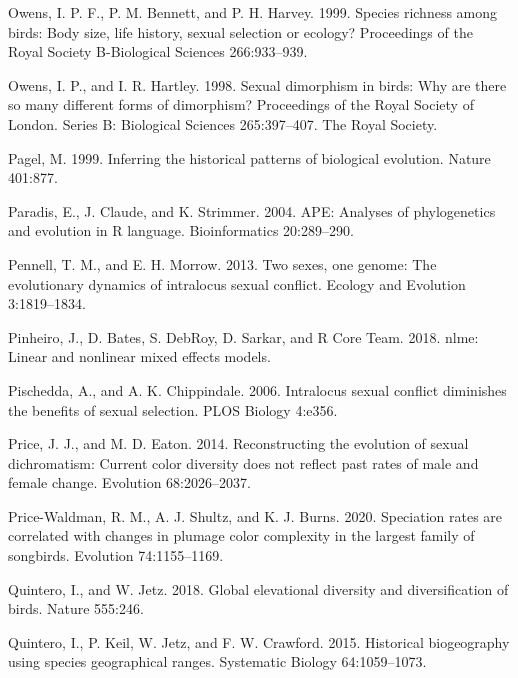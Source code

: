 \documentclass[]{article}
\begin{document}
\leavevmode\hypertarget{ref-Owens_1999}{}%
Owens, I. P. F., P. M. Bennett, and P. H. Harvey. 1999. Species richness
among birds: Body size, life history, sexual selection or ecology?
Proceedings of the Royal Society B-Biological Sciences 266:933--939.

\leavevmode\hypertarget{ref-owens_1998}{}%
Owens, I. P., and I. R. Hartley. 1998. Sexual dimorphism in birds: Why
are there so many different forms of dimorphism? Proceedings of the
Royal Society of London. Series B: Biological Sciences 265:397--407. The
Royal Society.

\leavevmode\hypertarget{ref-Pagel_1999}{}%
Pagel, M. 1999. Inferring the historical patterns of biological
evolution. Nature 401:877.

\leavevmode\hypertarget{ref-ape_2004}{}%
Paradis, E., J. Claude, and K. Strimmer. 2004. APE: Analyses of
phylogenetics and evolution in R language. Bioinformatics 20:289--290.

\leavevmode\hypertarget{ref-Pennell_2013}{}%
Pennell, T. M., and E. H. Morrow. 2013. Two sexes, one genome: The
evolutionary dynamics of intralocus sexual conflict. Ecology and
Evolution 3:1819--1834.

\leavevmode\hypertarget{ref-nlme_2018}{}%
Pinheiro, J., D. Bates, S. DebRoy, D. Sarkar, and R Core Team. 2018.
nlme: Linear and nonlinear mixed effects models.

\leavevmode\hypertarget{ref-Pischedda_2006}{}%
Pischedda, A., and A. K. Chippindale. 2006. Intralocus sexual conflict
diminishes the benefits of sexual selection. PLOS Biology 4:e356.

\leavevmode\hypertarget{ref-Price_2014}{}%
Price, J. J., and M. D. Eaton. 2014. Reconstructing the evolution of
sexual dichromatism: Current color diversity does not reflect past rates
of male and female change. Evolution 68:2026--2037.

\leavevmode\hypertarget{ref-Price-Waldman_2020}{}%
Price-Waldman, R. M., A. J. Shultz, and K. J. Burns. 2020. Speciation
rates are correlated with changes in plumage color complexity in the
largest family of songbirds. Evolution 74:1155--1169.

\leavevmode\hypertarget{ref-quintero_2018}{}%
Quintero, I., and W. Jetz. 2018. Global elevational diversity and
diversification of birds. Nature 555:246.

\leavevmode\hypertarget{ref-Quintero_2015}{}%
Quintero, I., P. Keil, W. Jetz, and F. W. Crawford. 2015. Historical
biogeography using species geographical ranges. Systematic Biology
64:1059--1073.
\end{document}
